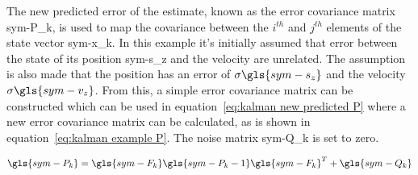 The new predicted error of the estimate, known as the error covariance matrix \gls{sym-P_k}, is used to map the
covariance between the \( i^{th} \) and \( j^{th} \) elements of the state vector \gls{sym-x_k}. In this example it's
initially assumed that error between the state of its position \gls{sym-s_z} and the velocity are unrelated. The
assumption is also made that the position has an error of \( \sigma{\gls{sym-s_z}} \) and the velocity \(
\sigma{\gls{sym-v_z} } \). From this, a simple error covariance matrix can be constructed which can be used in
equation~\ref{eq:kalman new predicted P} where a new error covariance matrix can be calculated, as is shown in
equation~\ref{eq:kalman example P}. The noise matrix \gls{sym-Q_k} is set to zero.

\begin{equation}
    \label{eq:kalman new predicted P}
    \gls{sym-P_k} = \gls{sym-F_k} \gls{sym-P_k-1} \gls{sym-F_k}^T + \gls{sym-Q_k}
\end{equation}

